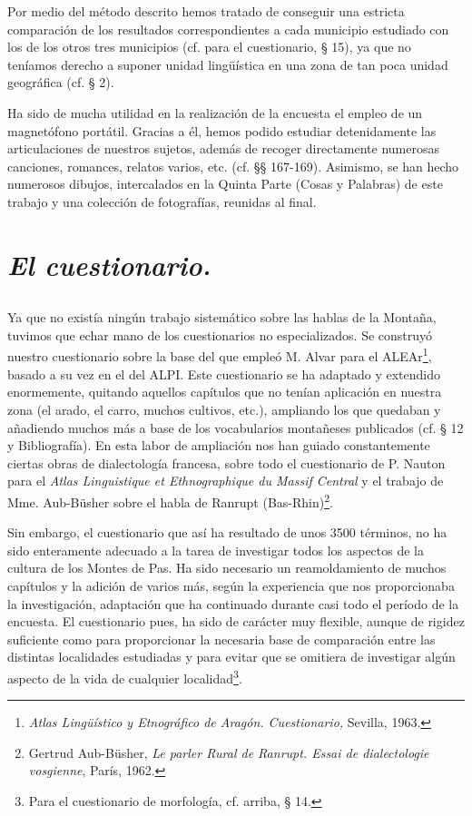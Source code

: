 Por medio del método descrito hemos tratado de conseguir una estricta comparación de los resultados correspondientes a cada municipio estudiado con los de los otros tres municipios (cf. para el cuestionario, § 15), ya que no teníamos derecho a suponer unidad lingüística en una zona de tan poca unidad geográfica (cf. § 2). 

Ha sido de mucha utilidad en la realización de la encuesta el empleo de un magnetófono portátil. Gracias a él, hemos podido estudiar detenidamente las articulaciones de nuestros sujetos, además de recoger directamente numerosas canciones, romances, relatos varios, etc. (cf. §§ 167-169). Asimismo, se han hecho numerosos dibujos, intercalados en la Quinta Parte (Cosas y Palabras) de este trabajo y una colección de fotografías, reunidas al final. 

\section{\emph{El cuestionario.}}

\subsection{} Ya que no existía ningún trabajo sistemático sobre las hablas de la Montaña, tuvimos que echar mano de los cuestionarios no especializados. Se construyó nuestro cuestionario sobre la base del que empleó M. Alvar para el ALEAr\footnote{\textit{Atlas Lingüístico y Etnográfico de Aragón. Cuestionario,} Sevilla, 1963.}, basado a su vez en el del ALPI. Este cuestionario se ha adaptado y extendido enormemente, quitando aquellos capítulos que no tenían aplicación en nuestra zona (el arado, el carro, muchos cultivos, etc.), ampliando los que quedaban y añadiendo muchos más a base de los vocabularios montañeses publicados (cf. § 12 y Bibliografía). En esta labor de ampliación nos han guiado constantemente ciertas obras de dialectología francesa, sobre todo el cuestionario de P. Nauton para el \textit{Atlas Linguistique et Ethnographique du Massif Central} y el trabajo de Mme. Aub-Büsher sobre el habla de Ranrupt (Bas-Rhin)\footnote{Gertrud Aub-Büsher, \textit{Le parler Rural de Ranrupt. Essai de dialectologie vosgienne}, París, 1962.}.

Sin embargo, el cuestionario que así ha resultado de unos 3500 términos, no ha sido enteramente adecuado a la tarea de investigar todos los aspectos de la cultura de los Montes de Pas. Ha sido necesario un reamoldamiento de muchos capítulos y la adición de varios más, según la experiencia que nos proporcionaba la investigación, adaptación que ha continuado durante casi todo el período de la encuesta. El cuestionario pues, ha sido de carácter muy flexible, aunque de rigidez suficiente como para proporcionar la necesaria base de comparación entre las distintas localidades estudiadas y para evitar que se omitiera de investigar algún aspecto de la vida de cualquier localidad\footnote{Para el cuestionario de morfología, cf. arriba, § 14.}.


